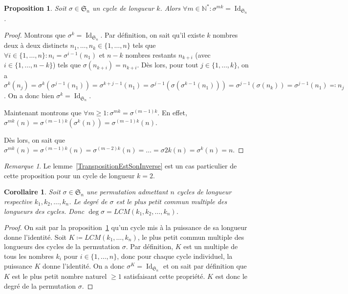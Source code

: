 \documentclass{article}
\DeclareMathOperator{\Id}{Id}
\newcommand{\N}{\mathbb N}
\newcommand{\Perm}{\mathfrak{S}}
\newtheorem{prp}[thm]{Proposition}
\newtheorem{cor}[thm]{Corollaire}
\theoremstyle{definition}
\theoremstyle{remark}
\newtheorem*{rmq}{Remarque}
\begin{document}
		\begin{prp}\label{PermPuissanceId} Soit $\sigma \in \Perm_n$ un cycle de longueur $k$. Alors $\forall m \in \N^* : \sigma^{mk} = \Id_{\Perm_n}$. \end{prp}

		\begin{proof} Montrons que $\sigma^k = \Id_{\Perm_n}$. Par définition, on sait qu'il existe $k$ nombres deux à deux distincts
		$n_1, \dotsc, n_k \in \{1, \dotsc, n\}$ tels que $\forall i \in \{1, \dotsc, n\} : n_i = \sigma^{i-1}(n_1)$ et $n-k$ nombres restants $n_{k+i}$
		(avec $i \in \{1, \dotsc, n-k\}$) tels que $\sigma(n_{k+i}) = n_{k+i}$. Dès lors, pour tout $j \in \{1, \dotsc, k\}$, on a
		$\sigma^k(n_j) = \sigma^k\left(\sigma^{j-1}(n_1)\right) = \sigma^{k+j-1}(n_1) = \sigma^{j-1}\left(\sigma\left(\sigma^{k-1}(n_1)\right)\right)
		= \sigma^{j-1}\left(\sigma(n_k)\right) = \sigma^{j-1}(n_1) \eqqcolon n_j$. On a donc bien $\sigma^k = \Id_{\Perm_n}$.

		Maintenant montrons que $\forall m \geq 1 : \sigma^{mk} = \sigma^{(m-1)k}$. En effet,
		$\sigma^{mk}(n) = \sigma^{(m-1)k}\left(\sigma^k(n)\right) = \sigma^{(m-1)k}(n)$.

		Dès lors, on sait que $\sigma^{mk}(n) = \sigma^{(m-1)k}(n) = \sigma^{(m-2)k}(n) = \ldots = \sigma{2k}(n) = \sigma^k(n) = n$. \end{proof}

		\begin{rmq} Le lemme~\ref{TranspositionEstSonInverse} est un cas particulier de cette proposition pour un cycle de longueur $k = 2$. \end{rmq}

		\begin{cor} Soit $\sigma \in \Perm_n$ une permutation admettant $n$ cycles de longueur respective $k_1, k_2, \dotsc, k_n$. Le degré de $\sigma$ est le plus
		petit commun multiple des longueurs des cycles. Donc $\deg \sigma = LCM(k_1, k_2, \dotsc, k_n)$. \end{cor}

		\begin{proof} On sait par la proposition~\ref{PermPuissanceId} qu'un cycle mis à la puissance de sa longueur donne l'identité. Soit
		$K \coloneqq LCM(k_1, \dotsc, k_n)$, le plus petit commun multiple des longueurs des cycles de la permutation $\sigma$. Par définition, $K$ est un multiple de
		tous les nombres $k_i$ pour $i \in \{1, \dotsc, n\}$, donc pour chaque cycle individuel, la puissance $K$ donne l'identité. On a donc
		$\sigma^{K} = \Id_{\Perm_n}$ et on sait par définition que $K$ est le plus petit nombre naturel $\geq 1$ satisfaisant cette propriété. $K$ est donc le degré de
		la permutation $\sigma$. \end{proof}
\end{document}
